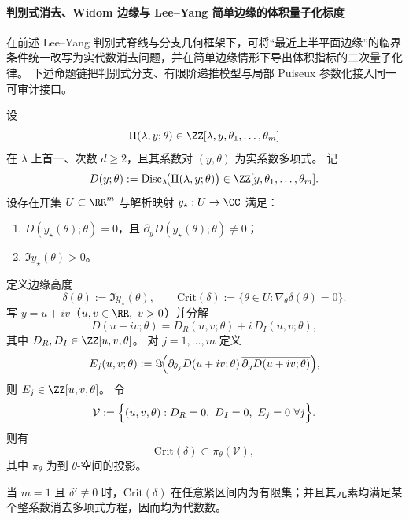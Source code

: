 \paragraph{判别式消去、Widom 边缘与 Lee--Yang 简单边缘的体积量子化标度}
在前述 Lee--Yang 判别式脊线与分支几何框架下，可将“最近上半平面边缘”的临界条件统一改写为实代数消去问题，并在简单边缘情形下导出体积指标的二次量子化律。
下述命题链把判别式分支、有限阶递推模型与局部 Puiseux 参数化接入同一可审计接口。

\begin{theorem}\label{thm:xi-discriminant-widom-elimination}
设
\[
\Pi(\lambda,y;\theta)\in \ZZ[\lambda,y,\theta_1,\dots,\theta_m]
\]
在 \(\lambda\) 上首一、次数 \(d\ge 2\)，且其系数对 \((y,\theta)\) 为实系数多项式。
记
\[
D(y;\theta):=\operatorname{Disc}_{\lambda}\!\bigl(\Pi(\lambda,y;\theta)\bigr)\in \ZZ[y,\theta_1,\dots,\theta_m].
\]
设存在开集 \(U\subset\RR^m\) 与解析映射 \(y_\star:U\to\CC\) 满足：
\begin{enumerate}
  \item \(D(y_\star(\theta);\theta)=0\)，且 \(\partial_y D(y_\star(\theta);\theta)\neq 0\)；
  \item \(\Im y_\star(\theta)>0\)。
\end{enumerate}
定义边缘高度
\[
\delta(\theta):=\Im y_\star(\theta),
\qquad
\mathrm{Crit}(\delta):=\{\theta\in U:\nabla_\theta\delta(\theta)=0\}.
\]
写 \(y=u+iv\)（\(u,v\in\RR,\ v>0\)）并分解
\[
D(u+iv;\theta)=D_R(u,v;\theta)+i\,D_I(u,v;\theta),
\]
其中 \(D_R,D_I\in\ZZ[u,v,\theta]\)。
对 \(j=1,\dots,m\) 定义
\[
E_j(u,v;\theta):=\Im\!\Bigl(\partial_{\theta_j}D(u+iv;\theta)\,
\overline{\partial_y D(u+iv;\theta)}\Bigr),
\]
则 \(E_j\in\ZZ[u,v,\theta]\)。
令
\[
\mathcal V:=
\Bigl\{
(u,v,\theta):
D_R=0,\ D_I=0,\ E_j=0\ \forall j
\Bigr\}.
\]
则有
\[
\mathrm{Crit}(\delta)\subset \pi_\theta(\mathcal V),
\]
其中 \(\pi_\theta\) 为到 \(\theta\)-空间的投影。

当 \(m=1\) 且 \(\delta'\not\equiv 0\) 时，\(\mathrm{Crit}(\delta)\) 在任意紧区间内为有限集；并且其元素均满足某个整系数消去多项式方程，因而均为代数数。
\end{theorem}
